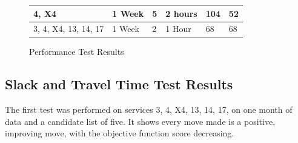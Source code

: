 \documentclass{article}
\begin{document}
\begin{figure}[H]
\begin{tabular}{|l|l|l|l|l|l|}
	4, X4                                   & 1 Week                                                                             & 5                                                                                           & 2 hours                                                                              & 104                                                                                      & 52                                                                                                    \\ \hline
	3, 4, X4, 13, 14, 17                    & 1 Week                                                                             & 2                                                                                           & 1 Hour                                                                               & 68                                                                                       & 68                                                                                                    \\ \hline
\end{tabular}
	\caption{Performance Test Results}
\end{figure}




\subsection{Slack and Travel Time Test Results}
\label{slackObj}

The first test was performed on services 3, 4, X4, 13, 14, 17, on one month of data and a candidate list of five. It shows every move made is a positive, improving move, with the objective function score decreasing. 
\end{document}
